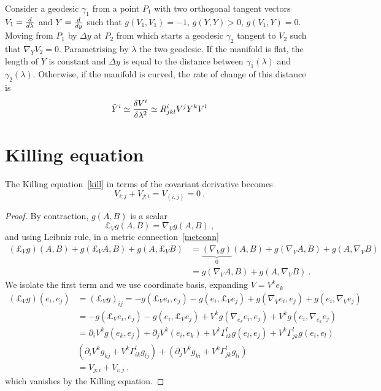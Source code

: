     Consider a geodesic $\gamma_1$ from a point $P_1$ with two orthogonal tangent vectors $V_1 = \frac{d}{d\lambda}$ and $Y = \frac{d}{dy}$ such that $g(V_1,V_1) = -1$, $g(Y, Y) > 0$, $g(V_1, Y) = 0$. Moving from $P_1$ by $\Delta y$ at $P_2$ from which starts a geodesic $\gamma_2$ tangent to $V_2$ such that $\nabla_Y V_2 = 0$. Parametrising by $\lambda$ the two geodesic. If the manifold is flat, the length of $Y$ is constant and $\Delta y$ is equal to the distance between $\gamma_1(\lambda)$ and $\gamma_2(\lambda)$. Otherwise, if the manifold is curved, the rate of change of this distance is 
    \begin{equation*}
        \ddot Y^i \simeq \frac{\delta V^i}{\delta \lambda^2} \simeq R^i_{jkl} V^j Y^k V^l
    \end{equation*}

\section{Killing equation}

    The Killing equation~\eqref{kill} in terms of the covariant derivative becomes 
    \begin{equation*}
        V_{i;j} + V_{j;i} = V_{(i,j)} = 0 ~.
    \end{equation*}

    \begin{proof}
        By contraction, $g(A,B)$ is a scalar
        \begin{equation*}
            \pounds_V g(A, B) = \nabla_V g(A,B) ~,
        \end{equation*}
        and using Leibniz rule, in a metric connection~\eqref{metconn}
        \begin{equation*}
        \begin{aligned}
            (\pounds_V g) (A, B) + g(\pounds_V A, B) + g(A, \pounds_V B) & = \underbrace{(\nabla_V g)}_0 (A, B) + g(\nabla_V A, B) + g(A, \nabla_V B) \\ & = g(\nabla_V A, B) + g(A, \nabla_V B) ~.
        \end{aligned}
        \end{equation*}
        We isolate the first term and we use coordinate basis, expanding $V = V^k e_k$
        \begin{equation*}
        \begin{aligned}
            (\pounds_V g) (e_i, e_j) & = (\pounds_V g)_{ij} = - g(\pounds_V e_i, e_j) - g(e_i, \pounds_V e_j) + g(\nabla_V e_i, e_j) + g(e_i, \nabla_V e_j) \\ & = - g(\pounds_V e_i, e_j) - g(e_i, \pounds_V e_j) + V^k g(\nabla_{e_k} e_i, e_j) + V^k g(e_i, \nabla_{e_k} e_j) \\ & = \partial_i V^k g(e_k, e_j) + \partial_j V^k (e_i, e_k) + V^k \Gamma^l_{ik} g(e_l, e_j) + V^k \Gamma^l_{jk} g(e_i, e_l) \\ & (\partial_i V^k g_{kj} + V^k \Gamma^l_{ik} g_{lj}) + (\partial_j V^k g_{ki} + V^k \Gamma^l_{jk} g_{li}) \\ & = V_{j;i} + V_{i;j} ~,
        \end{aligned}
        \end{equation*}
        which vanishes by the Killing equation.
    \end{proof}

